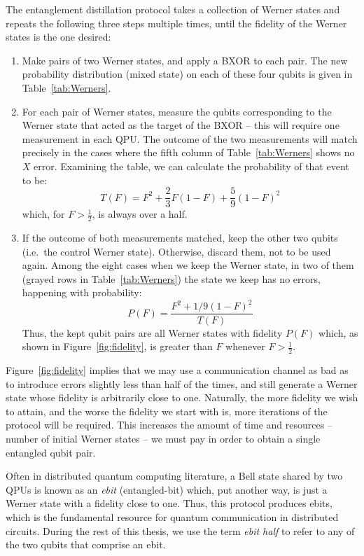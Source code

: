 The entanglement distillation protocol takes a collection of Werner states and repeats the following three steps multiple times, until the fidelity of the Werner states is the one desired:

\begin{enumerate}
  \item Make pairs of two Werner states, and apply a BXOR to each pair. The new probability distribution (mixed state) on each of these four qubits is given in Table~\ref{tab:Werners}.

  \item For each pair of Werner states, measure the qubits corresponding to the Werner state that acted as the target of the BXOR -- this will require one measurement in each QPU. The outcome of the two measurements will match precisely in the cases where the fifth column of Table~\ref{tab:Werners} shows no \(X\) error. Examining the table, we can calculate the probability of that event to be: {\small \[T(F) = F^2 + \frac{2}{3} F(1-F) + \frac{5}{9} (1-F)^2\]}which, for \(F > \frac{1}{2}\), is always over a half.

  \item If the outcome of both measurements matched, keep the other two qubits (i.e.\ the control Werner state). Otherwise, discard them, not to be used again. Among the eight cases when we keep the Werner state, in two of them (grayed rows in Table~\ref{tab:Werners}) the state we keep has no errors, happening with probability: {\small \[P(F) = \frac{F^2 + 1/9(1-F)^2}{T(F)}\]}Thus, the kept qubit pairs are all Werner states with fidelity \(P(F)\) which, as shown in Figure~\ref{fig:fidelity}, is greater than \(F\) whenever \(F > \frac{1}{2}\).
\end{enumerate}





Figure~\ref{fig:fidelity} implies that we may use a communication channel as bad as to introduce errors slightly less than half of the times, and still generate a Werner state whose fidelity is arbitrarily close to one. Naturally, the more fidelity we wish to attain, and the worse the fidelity we start with is, more iterations of the protocol will be required. This increases the amount of time and resources -- number of initial Werner states -- we must pay in order to obtain a single entangled qubit pair.

Often in distributed quantum computing literature, a Bell state shared by two QPUs is known as an \textit{ebit} (entangled-bit) which, put another way, is just a Werner state with a fidelity close to one. Thus, this protocol produces ebits, which is the fundamental resource for quantum communication in distributed circuits. During the rest of this thesis, we use the term \textit{ebit half} to refer to any of the two qubits that comprise an ebit.

